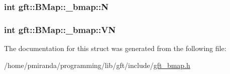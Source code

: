\subsubsection[{\texorpdfstring{N}{N}}]{\setlength{\rightskip}{0pt plus 5cm}int gft\+::\+B\+Map\+::\+\_\+bmap\+::N}\hypertarget{structgft_1_1BMap_1_1__bmap_ae6e8644f37ce49bafb0a6227afcf2a3b}{}\label{structgft_1_1BMap_1_1__bmap_ae6e8644f37ce49bafb0a6227afcf2a3b}
\subsubsection[{\texorpdfstring{VN}{VN}}]{\setlength{\rightskip}{0pt plus 5cm}int gft\+::\+B\+Map\+::\+\_\+bmap\+::\+VN}\hypertarget{structgft_1_1BMap_1_1__bmap_a9cdac1fc2425919764aff0630ef907d2}{}\label{structgft_1_1BMap_1_1__bmap_a9cdac1fc2425919764aff0630ef907d2}


The documentation for this struct was generated from the following file\+:\begin{DoxyCompactItemize}
\item 
/home/pmiranda/programming/lib/gft/include/\hyperlink{gft__bmap_8h}{gft\+\_\+bmap.\+h}\end{DoxyCompactItemize}
